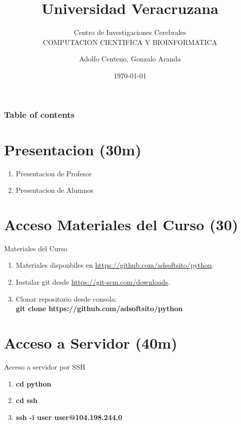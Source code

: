 \documentclass{beamer}
\begin{document}
\title{Universidad Veracruzana}  
\subtitle{Centro de Investigaciones Cerebrales\\COMPUTACION CIENTIFICA Y BIOINFORMATICA}
\author{Adolfo Centeno, Gonzalo Aranda}
\date{\today} 

\begin{frame}
\titlepage
\end{frame}

\begin{frame}\frametitle{Table of contents}
\tableofcontents
\end{frame} 


\section{Presentacion (30m) }

\begin{frame} 

\begin{enumerate}
\item
 Presentacion de Profesor
\item
 Presentacion de Alumnos
\end{enumerate} 


\end{frame}


\section{Acceso Materiales del Curso (30) }

\begin{frame}

Materiales del Curso

\begin{enumerate}
\item
	Materiales disponbiles en \href{https://github.com/adsoftsito/python}{https://github.com/adsoftsito/python}.
\item
    Instalar git desde \href{https://git-scm.com/downloads}{https://git-scm.com/downloads}.
\item
	Clonar repositorio desde consola: \\ 
 	\textbf{git clone https://github.com/adsoftsito/python}
	

\end{enumerate} 

\end{frame}


\section{Acceso a Servidor (40m) }

\begin{frame}


Acceso a servidor por SSH

\begin{enumerate}
\item
	\textbf{cd python}
\item
	\textbf{cd ssh}
\item
	\textbf{ssh -i user user@104.198.244.0}
\end{enumerate} 


\end{frame}
\end{document}
